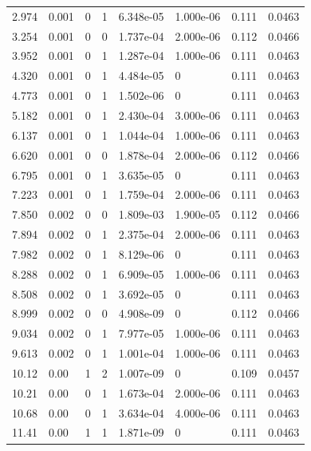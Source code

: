 \documentclass[preview]{standalone}
\begin{document}
{{\begin{tabular}{L{1.2cm}C{1.2cm} C{0.3cm}C{0.5cm} C{1.4cm}C{1.4cm} C{1.4cm}C{1.4cm}}
  2.974  &  0.001  & 0     &  1 &  6.348e-05  & 1.000e-06  & 0.111 &  0.0463   \\ 
  3.254  &  0.001  & 0     &  0 &  1.737e-04  & 2.000e-06  & 0.112 &  0.0466   \\ 
  3.952  &  0.001  & 0     &  1 &  1.287e-04  & 1.000e-06  & 0.111 &  0.0463   \\ 
  4.320  &  0.001  & 0     &  1 &  4.484e-05  & 0  & 0.111 &  0.0463   \\ 
  4.773  &  0.001  & 0     &  1 &  1.502e-06  & 0  & 0.111 &  0.0463   \\ 
  5.182  &  0.001  & 0     &  1 &  2.430e-04  & 3.000e-06  & 0.111 &  0.0463   \\ 
  6.137  &  0.001  & 0     &  1 &  1.044e-04  & 1.000e-06  & 0.111 &  0.0463   \\ 
  6.620  &  0.001  & 0     &  0 &  1.878e-04  & 2.000e-06  & 0.112 &  0.0466   \\ 
  6.795  &  0.001  & 0     &  1 &  3.635e-05  & 0  & 0.111 &  0.0463   \\ 
  7.223  &  0.001  & 0     &  1 &  1.759e-04  & 2.000e-06  & 0.111 &  0.0463   \\ 
  7.850  &  0.002  & 0     &  0 &  1.809e-03  & 1.900e-05  & 0.112 &  0.0466   \\ 
  7.894  &  0.002  & 0     &  1 &  2.375e-04  & 2.000e-06  & 0.111 &  0.0463   \\ 
  7.982  &  0.002  & 0     &  1 &  8.129e-06  & 0  & 0.111 &  0.0463   \\ 
  8.288  &  0.002  & 0     &  1 &  6.909e-05  & 1.000e-06  & 0.111 &  0.0463   \\ 
  8.508  &  0.002  & 0     &  1 &  3.692e-05  & 0  & 0.111 &  0.0463   \\ 
  8.999  &  0.002  & 0     &  0 &  4.908e-09  & 0  & 0.112 &  0.0466   \\ 
  9.034  &  0.002  & 0     &  1 &  7.977e-05  & 1.000e-06  & 0.111 &  0.0463   \\ 
  9.613  &  0.002  & 0     &  1 &  1.001e-04  & 1.000e-06  & 0.111 &  0.0463   \\ 
  10.12  &  0.00  & 1     &  2 &  1.007e-09  & 0  & 0.109 &  0.0457   \\ 
  10.21  &  0.00  & 0     &  1 &  1.673e-04  & 2.000e-06  & 0.111 &  0.0463   \\ 
  10.68  &  0.00  & 0     &  1 &  3.634e-04  & 4.000e-06  & 0.111 &  0.0463   \\ 
  11.41  &  0.00  & 1     &  1 &  1.871e-09  & 0  & 0.111 &  0.0463   \\ 

\end{tabular}}}
\end{document}
